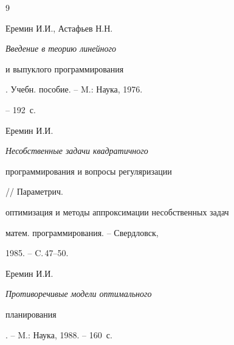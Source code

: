 \begin{thebibliography}{9}







Еремин И.И., Астафьев Н.Н. {\em Введение в теорию линейного


и выпуклого программирования}. Учебн. пособие. -- M.: Наука, 1976.


-- 192~с.




Еремин И.И. {\em Несобственные задачи квадратичного


программирования и вопросы регуляризации} // Параметрич.


оптимизация и методы аппроксимации несобственных задач


матем. программирования. -- Свердловск,


1985. -- C.\,47--50.




Еремин И.И. {\em Противоречивые модели оптимального


планирования}. -- M.: Наука, 1988. -- 160~с.





\end{thebibliography}





\vskip 2cm














\label{end}








